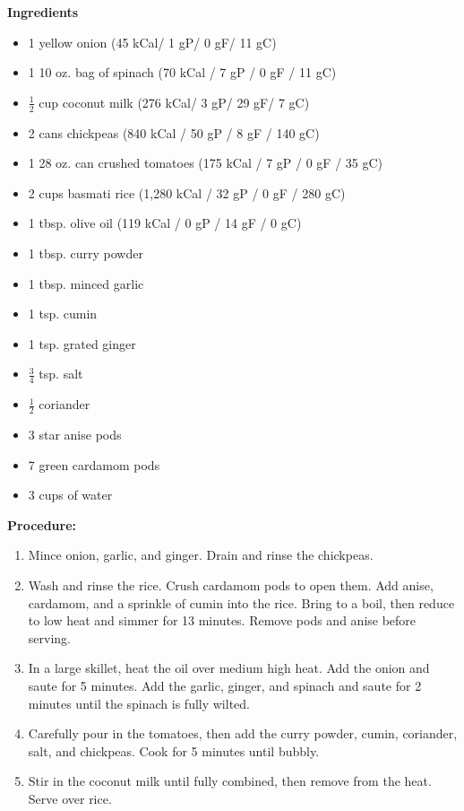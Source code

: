 \begin{multicols}{2}
\textbf{Ingredients}
\begin{itemize}
\item 1 yellow onion \quad (45 kCal/ 1 gP/ 0 gF/ 11 gC)
\item 1 10 oz. bag of spinach \newline(70 kCal / 7 gP / 0 gF / 11 gC)
\item $\frac{1}{2}$ cup coconut milk \quad (276 kCal/ 3 gP/ 29 gF/ 7 gC)
\item 2 cans chickpeas \quad (840 kCal / 50 gP / 8 gF / 140 gC)
\item 1 28 oz. can crushed tomatoes \newline (175 kCal / 7 gP / 0 gF / 35 gC)
\item 2 cups basmati rice \quad (1,280 kCal / 32 gP / 0 gF / 280 gC)
\item 1 tbsp. olive oil \quad (119 kCal / 0 gP / 14 gF / 0 gC)
\item 1 tbsp. curry powder
\item 1 tbsp. minced garlic
\item 1 tsp. cumin
\item 1 tsp. grated ginger
\item $\frac{3}{4}$ tsp. salt 
\item $\frac{1}{2}$ coriander
\item 3 star anise pods
\item 7 green cardamom pods
\item 3 cups of water 


\end{itemize}


\columnbreak
\textbf{Procedure:}
\medskip


\begin{enumerate}
\item Mince onion, garlic, and ginger. Drain and rinse the chickpeas. 
\item Wash and rinse the rice. Crush cardamom pods to open them. Add anise, cardamom, and a sprinkle of cumin into the rice. Bring to a boil, then reduce to low heat and simmer for 13 minutes. Remove pods and anise before serving. 
\item In a large skillet, heat the oil over medium high heat. Add the onion and saute for 5 minutes. Add the garlic, ginger, and spinach and saute for 2 minutes until the spinach is fully wilted.
\item Carefully pour in the tomatoes, then add the curry powder, cumin, coriander, salt, and chickpeas. Cook for 5 minutes until bubbly.
\item Stir in the coconut milk until fully combined, then remove from the heat. Serve over rice.




\end{enumerate}
\end{multicols}
